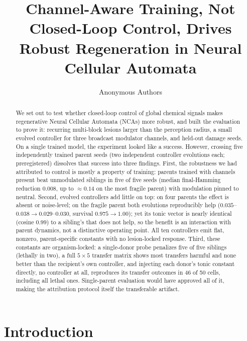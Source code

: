 \documentclass{article}
\title{Channel-Aware Training, Not Closed-Loop Control, Drives Robust Regeneration in Neural Cellular Automata}
\author{Anonymous Authors}
\begin{document}
\maketitle

\maketitle

\begin{abstract}
We set out to test whether closed-loop control of global chemical signals
makes regenerative Neural Cellular Automata (NCAs) more robust, and built
the evaluation to prove it: recurring multi-block lesions larger than the
perception radius, a small evolved controller for three broadcast
modulator channels, and held-out damage seeds. On a single trained model, the
experiment looked like a success. However, crossing five independently trained
parent seeds (two independent controller evolutions each;
preregistered) dissolves that success into three findings. First, the robustness we had attributed to control is
mostly a property of training: parents trained with channels present beat
unmodulated siblings in five of five seeds (median final-Hamming
reduction $0.008$, up to $\approx 0.14$ on the most fragile parent) with
modulation pinned to neutral. Second, evolved controllers add little on
top: on four parents the effect is absent or noise-level; on the fragile
parent both evolutions reproducibly help ($0.035$--$0.038 \to
0.029$--$0.030$, survival $0.975 \to 1.00$); yet its tonic vector is
nearly identical (cosine $0.99$) to a sibling's that does not help, so
the benefit is an interaction with parent dynamics, not a distinctive
operating point. All ten controllers emit flat, nonzero, parent-specific
constants with no lesion-locked response. Third, these constants are
organism-locked: a single-donor probe penalizes five of five siblings
(lethally in two), a full $5{\times}5$ transfer matrix shows most
transfers harmful and none better than the recipient's own controller,
and injecting each donor's tonic constant directly, no controller at
all, reproduces its transfer outcomes in 46 of 50 cells, including
all lethal ones. Single-parent evaluation would have approved all of it, making the attribution protocol itself the transferable artifact.
\end{abstract}

\section{Introduction}
\label{sec:intro}
\end{document}
